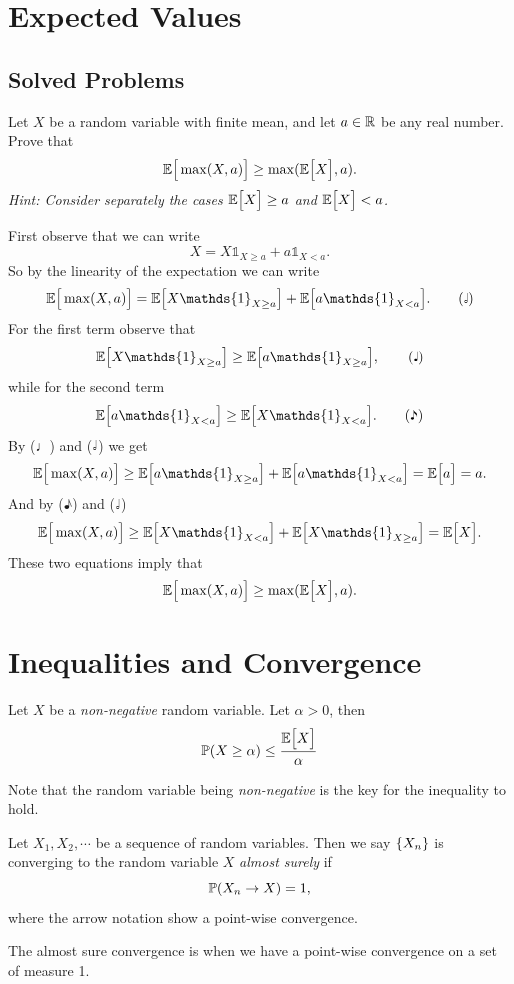 \section{Expected Values}
\subsection{Solved Problems}
\begin{problem}
	Let $ X $ be a random variable with finite mean, and let $ a\in \mathbb{R} $ be any real number. Prove that 
	\[ \mathbb{E}\big[\max(X,a)\big] \geq \max(\mathbb{E}\big[X\big],a). \]
	\emph{Hint: Consider separately the cases $ \mathbb{E}\big[X\big]\geq a $ and $ \mathbb{E}\big[X\big]<a $.}
\end{problem}
\begin{solution}
	First observe that we can write
	$$ X = X \mathds{1}_{X\geq a} + a \mathds{1}_{X<a}. $$
	So by the linearity of the expectation we can write
	\[\E{\max(X,a)} = \E{X\mathds{1}_{X\geq a}} + \E{a\mathds{1}_{X<a}}. \tag{\halfnote}\]
	For the first term observe that 
	\[ \E{X\mathds{1}_{X\geq a}} \geq \E{a\mathds{1}_{X\geq a}}, \tag{\quarternote} \]
	while for the second term
	\[ \E{a\mathds{1}_{X< a}} \geq \E{X\mathds{1}_{X< a}}. \tag{\eighthnote}\]
	By ($ \quarternote $) and ($ \halfnote $) we get
	\[ \E{\max(X,a)} \geq \E{a\mathds{1}_{X\geq a}} + \E{a\mathds{1}_{X<a}} = \E{a} = a. \]
	And by ($ \eighthnote $) and ($ \halfnote $)
	\[ \E{\max(X,a)} \geq \E{X\mathds{1}_{X< a}} + \E{X\mathds{1}_{X\geq a}} = \E{X}. \]
	These two equations imply that
	\[ \mathbb{E}\big[\max(X,a)\big] \geq \max(\mathbb{E}\big[X\big],a). \]
\end{solution}




\section{Inequalities and Convergence}
\begin{proposition}
	Let $ X $ be a \emph{non-negative} random variable. Let $ \alpha > 0 $, then
	\[ \mathbb{P}(X\geq \alpha)\leq \frac{\mathbb{E}\big[X\big]}{\alpha} \]
\end{proposition}

\begin{remark}
	Note that the random variable being \emph{non-negative} is the key for the inequality to hold.
\end{remark}

\begin{definition}
	Let $ X_1,X_2,\cdots $ be a sequence of random variables. Then we say $ \{X_n\} $ is converging to the random variable $ X $ \emph{almost surely} if
	\[ \mathbb{P}(X_n \to X) = 1, \]
	where the arrow notation show a point-wise convergence. 
\end{definition}
\begin{remark}
	The almost sure convergence is when we have a point-wise convergence on a set of measure 1.
\end{remark}

